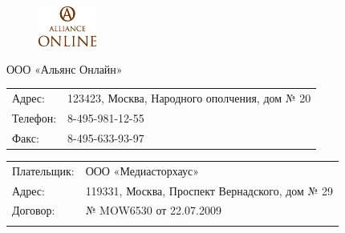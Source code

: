 \documentclass[a4paper,10pt]{article}
\begin{document}
\begin{figure}
  \begin{center}
  \vspace{-3ex}
    \includegraphics[width=0.17\textwidth]{image.eps}
  \end{center}
\end{figure}



\Large {ООО «Альянс Онлайн»}

\small
\begin{tabular}{ll}
\\
Адрес: & 123423, Москва, Народного ополчения, дом № 20\\
Телефон: & 8-495-981-12-55 \\
Факс: & 8-495-633-93-97 \\
\end{tabular}

\begin{tabular}{ll}
\\
Плательщик: & \Large {ООО «Медиасторхаус»}\\
Адрес: & 119331, Москва, Проспект Вернадского, дом № 29 \\
Договор: & \Large {№ MOW6530 от 22.07.2009} \\
\\
\end{tabular}
\end{document}
